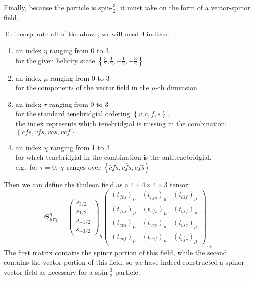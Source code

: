 Finally, because the particle is spin-\(\frac{3}{2}\), it must take on the form of a vector-spinor field.

\begin{definition}
  To incorporate all of the above, we will need 4 indices:
  \begin{enumerate}
    \item an index \(\eta\) ranging from 0 to 3\\
          for the given helicity state \(\left\{\frac{3}{2},\frac{1}{2},-\frac{1}{2},-\frac{3}{2}\right\}\)
    \item an index \(\mu\) ranging from 0 to 3\\
          for the components of the vector field in the \(\mu\)-th dimension
    \item an index \(\tau\) ranging from 0 to 3\\
          for the standard tenebridgial ordering \(\left\{v,c,f,s\right\}\),\\
          the index represents which tenebridgial is missing in the combination:
          \(\left\{cfs,vfs,vcs,vcf\right\}\)
    \item an index \(\chi\) ranging from 1 to 3\\
          for which tenebridgial in the combination is the antitenebridgial.\\
          e.g.\ for \(\tau=0\), \(\chi\) ranges over \(\left\{\bar{c}fs,c\bar{f}s,cf\bar{s}\right\}\)
  \end{enumerate}
  Then we can define the thuleon field as a \(4\times4\times4\times3\) tensor:
  \begin{equation}
    \Theta^{\eta}_{\mu \tau \chi}
    =
    \begin{pmatrix}s_{3/2}\\s_{1/2}\\s_{-1/2}\\s_{-3/2}\end{pmatrix}_{\eta}
    \begin{pmatrix}
      \left(t_{f \bar{c} s}\right)_{\mu} & \left(t_{c \bar{f} s}\right)_{\mu} & \left(t_{c \bar{s} f}\right)_{\mu} \\
      \left(t_{f \bar{v} s}\right)_{\mu} & \left(t_{v \bar{f} s}\right)_{\mu} & \left(t_{v \bar{s} f}\right)_{\mu} \\
      \left(t_{c \bar{v} s}\right)_{\mu} & \left(t_{v \bar{c} s}\right)_{\mu} & \left(t_{v \bar{s} c}\right)_{\mu} \\
      \left(t_{c \bar{v} f}\right)_{\mu} & \left(t_{v \bar{c} f}\right)_{\mu} & \left(t_{v \bar{f} c}\right)_{\mu}
    \end{pmatrix}_{\tau \chi}
  \end{equation}
  The first matrix contains the spinor portion of this field, while the second contains the vector portion of this field, so we have indeed constructed a spinor-vector field as necessary for a spin-\(\frac{3}{2}\) particle.
\end{definition}

